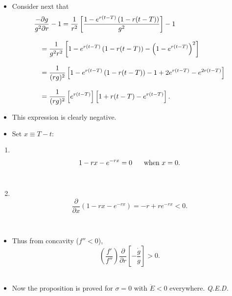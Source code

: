 \documentclass[12pt,compress,handout]{beamer}  %
\begin{document}
\begin{frame}

\begin{itemize}
\item Consider next that
\begin{align*}
&\frac{-\partial g}{g^2\partial r}-1=\frac{1}{r^2}\left[ \frac{1-e^{r(t-T)}\left( 1-r(t-T)\right)}{g^2}\right] -1\\[3mm]
&\hspace{3mm}=\frac{1}{g^2r^2}\left[ 1-e^{r(t-T)}\left(1-r(t-T)\right) -\left(1-e^{r(t-T)}\right) ^2\right] \\[3mm]
&\hspace{3mm}=\frac{1}{(rg)^2}\left[ 1-e^{r(t-T)}\left(1-r(t-T)\right) -1+2e^{r(t-T)}-e^{2r(t-T)}\right] \\[3mm]
&\hspace{3mm}=\frac{1}{(rg)^2}\left[ e^{r(t-T)}\right] \left[
1+r(t-T)-e^{r(t-T)}\right] \text{.}
\end{align*}
\end{itemize}

\end{frame}


\begin{frame}

\begin{itemize}
\item This expression is clearly negative.\\[3mm]

\item
Set $x\equiv T-t$:\\[3mm]
\end{itemize}
\begin{enumerate}[(1)]
\item \ \\[-10mm]
\begin{equation*}
1-rx-e^{-rx}=0\hspace{6mm}\text{when }x=0\text{.}
\end{equation*}\ \\[5mm]
\item \ \\[-10mm]
\begin{equation*}
\frac{\partial }{\partial x}\left( 1-rx-e^{-rx}\right)
=-r+re^{-rx}<0\text{.}
\end{equation*}
\end{enumerate}\ \\[6mm]
\begin{itemize}
\item Thus from concavity ($f''<0$),
\begin{equation*}
\left( \frac{f'}{f''}\right) \frac{\partial }{\partial r}\left[
-\frac{\dot{g}}{g}\right] >0\text{.}
\end{equation*}\ \\[4mm]
\item Now the proposition is proved for $\sigma =0$ with $\ddot{E}<0$ everywhere. {\itshape Q.E.D.}
\end{itemize}
\end{frame}
\end{document}
